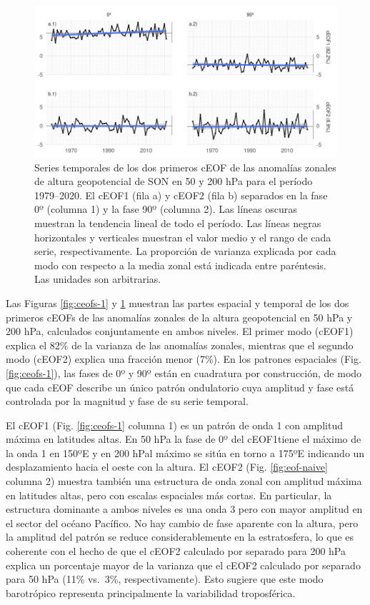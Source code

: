\documentclass[12pt,oneside,a4paper]{reedthesis}
\begin{document}
\begin{figure}

{\centering \includegraphics{figures/20-ceofs/extended-series-1} 

}

\caption{Series temporales de los dos primeros cEOF de las anomalías zonales de altura geopotencial de SON en 50 y 200 hPa para el período 1979--2020. El cEOF1 (fila a) y cEOF2 (fila b) separados en la fase 0º (columna 1) y la fase 90º (columna 2). Las líneas oscuras muestran la tendencia lineal de todo el período. Las líneas negras horizontales y verticales muestran el valor medio y el rango de cada serie, respectivamente. La proporción de varianza explicada por cada modo con respecto a la media zonal está indicada entre paréntesis. Las unidades son arbitrarias.}\label{fig:extended-series}
\end{figure}

Las Figuras \ref{fig:ceofs-1} y \ref{fig:extended-series} muestran las partes espacial y temporal de los dos primeros cEOFs de las anomalías zonales de la altura geopotencial en 50 hPa y 200 hPa, calculados conjuntamente en ambos niveles.
El primer modo (cEOF1) explica el 82\% de la varianza de las anomalías zonales, mientras que el segundo modo (cEOF2) explica una fracción menor (7\%).
En los patrones espaciales (Fig. \ref{fig:ceofs-1}), las fases de 0º y 90º están en cuadratura por construcción, de modo que cada cEOF describe un único patrón ondulatorio cuya amplitud y fase está controlada por la magnitud y fase de su serie temporal.

El cEOF1 (Fig. \ref{fig:ceofs-1} columna 1) es un patrón de onda 1 con amplitud máxima en latitudes altas.
En 50 hPa la fase de 0º del cEOF1tiene el máximo de la onda 1 en 150ºE y en 200 hPal máximo se sitúa en torno a 175ºE indicando un desplazamiento hacia el oeste con la altura.
El cEOF2 (Fig. \ref{fig:eof-naive} columna 2) muestra también una estructura de onda zonal con amplitud máxima en latitudes altas, pero con escalas espaciales más cortas.
En particular, la estructura dominante a ambos niveles es una onda 3 pero con mayor amplitud en el sector del océano Pacífico.
No hay cambio de fase aparente con la altura, pero la amplitud del patrón se reduce considerablemente en la estratosfera, lo que es coherente con el hecho de que el cEOF2 calculado por separado para 200 hPa explica un porcentaje mayor de la varianza que el cEOF2 calculado por separado para 50 hPa (11\% vs.~3\%, respectivamente).
Esto sugiere que este modo barotrópico representa principalmente la variabilidad troposférica.
\end{document}

